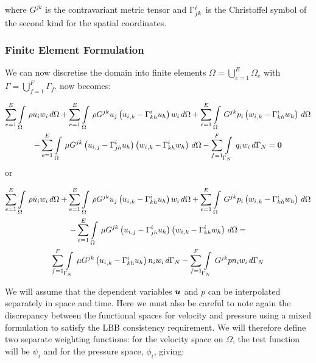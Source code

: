 where $G^{jk}$ is the contravariant metric tensor and
$ \Gamma^{i}_{jk} $ is the Christoffel symbol of the second kind for the spatial coordinates.

\subsubsection{Finite Element Formulation}

We can now discretise the domain into finite elements \ie $\Omega=\displaystyle{\bigcup_{e=1}^{E}}\Omega_{e}$ with $\Gamma=\displaystyle{\bigcup_{f=1}^{F}}\Gamma_{f}$.  now becomes:

\begin{multline}
 \label{FEMNSE}
  \displaystyle\sum_{e=1}^{E}  \displaystyle\int\limits_{\Omega}^{} \,\rho\dot{u}_{i}w_{i}\,d\Omega 
 +\displaystyle\sum_{e=1}^{E}  \displaystyle\int\limits_{\Omega}^{} \,{\rho}G^{jk}{u_j}\left(  {u_{i}}_{,k} - \Gamma^{i}_{kh} u_h \right){w_{i}}\,d\Omega 
 +\displaystyle\sum_{e=1}^{E}  \displaystyle\int\limits_{\Omega}^{} \,G^{jk}{p_{i}}\left(  {w_{i}}_{,k} - \Gamma^{i}_{kh} w_h \right)\,d\Omega \\
 -\displaystyle\sum_{e=1}^{E}  \displaystyle\int\limits_{\Omega}^{} \,{\mu}G^{jk}\left(  {u_{i}}_{,j} - \Gamma^{i}_{jh} u_h \right)\left(  {w_{i}}_{,k} - \Gamma^{i}_{kh} w_h \right)\,d\Omega 
 -\displaystyle\sum_{f=1}^{F}  \displaystyle\int\limits_{\Gamma_N}^{} \,{q_{i}}{w_i}\,d\Gamma_N =\boldsymbol{0}
\end{multline} 
or


\begin{multline}
 \label{FEMNSE2}
  \displaystyle\sum_{e=1}^{E}  \displaystyle\int\limits_{\Omega}^{} \,\rho\dot{u}_{i}w_{i}\,d\Omega 
 +\displaystyle\sum_{e=1}^{E}  \displaystyle\int\limits_{\Omega}^{} \,{\rho}G^{jk}{u_j}\left(  {u_{i}}_{,k} - \Gamma^{i}_{kh} u_h \right){w_{i}}\,d\Omega 
 +\displaystyle\sum_{e=1}^{E}  \displaystyle\int\limits_{\Omega}^{} \,G^{jk}{p_{i}}\left(  {w_{i}}_{,k} - \Gamma^{i}_{kh} w_h \right)\,d\Omega \\
 -\displaystyle\sum_{e=1}^{E}  \displaystyle\int\limits_{\Omega}^{} \,{\mu}G^{jk}\left(  {u_{i}}_{,j} - \Gamma^{i}_{jh} u_h \right)\left(  {w_{i}}_{,k} - \Gamma^{i}_{kh} w_h \right)\,d\Omega =\\
 \displaystyle\sum_{f=1}^{F}  \displaystyle\int\limits_{\Gamma_N}^{} \,{\mu}G^{jk}\left(  {u_{i}}_{,k} - \Gamma^{i}_{kh} u_h \right){n_{i}}{w_{i}}\,d\Gamma_N 
-\displaystyle\sum_{f=1}^{F}  \displaystyle\int\limits_{\Gamma_N}^{} \,G^{jk}{p}{n_i}{w_i}\,d\Gamma_N 
\end{multline} 


We will assume that the dependent variables $\boldsymbol{u}$ and $p$ can be interpolated separately in space and time. Here we must also be careful to note again the discrepancy between the functional spaces for velocity and pressure using a mixed formulation to satisfy the LBB consistency requirement. We will therefore define two separate weighting functions: for the velocity space on $\Omega$, the test function will be $\psi_i$ and for the pressure space, $\phi_i$, giving:

